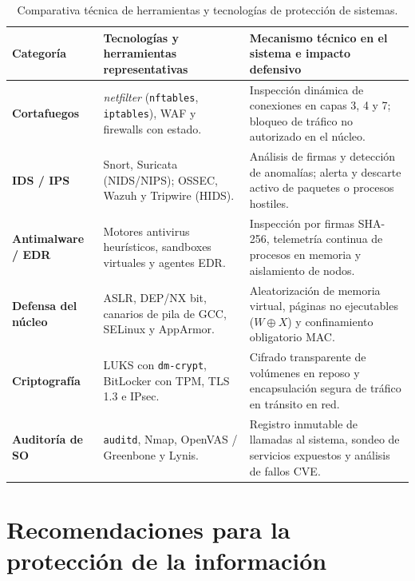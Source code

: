 \documentclass[12pt]{article}
\begin{document}
\begin{table}[htbp]
\centering
\footnotesize
\renewcommand{\arraystretch}{1.1}
\renewcommand{\tabularxcolumn}[1]{m{#1}}
\setlength{\emergencystretch}{1.5em}
\caption{Comparativa técnica de herramientas y tecnologías de protección de sistemas.}
\label{tab:comparativaHerramientasSeguridad}
\begin{tabularx}{\textwidth}{>{\centering\arraybackslash}m{2.4cm} X X}
\toprule
\textbf{Categoría} & \textbf{Tecnologías y herramientas representativas} & \textbf{Mecanismo técnico en el sistema e impacto defensivo} \\
\midrule
\textbf{Cortafuegos} & \textit{netfilter} (\texttt{nftables}, \texttt{iptables}), WAF y firewalls con estado. & Inspección dinámica de conexiones en capas 3, 4 y 7; bloqueo de tráfico no autorizado en el núcleo. \\
\addlinespace
\textbf{IDS / IPS} & Snort, Suricata (NIDS/NIPS); OSSEC, Wazuh y Tripwire (HIDS). & Análisis de firmas y detección de anomalías; alerta y descarte activo de paquetes o procesos hostiles. \\
\addlinespace
\textbf{Antimalware / EDR} & Motores antivirus heurísticos, sandboxes virtuales y agentes EDR. & Inspección por firmas SHA-256, telemetría continua de procesos en memoria y aislamiento de nodos. \\
\addlinespace
\textbf{Defensa del núcleo} & ASLR, DEP/NX bit, canarios de pila de GCC, SELinux y AppArmor. & Aleatorización de memoria virtual, páginas no ejecutables ($W \oplus X$) y confinamiento obligatorio MAC. \\
\addlinespace
\textbf{Criptografía} & LUKS con \texttt{dm-crypt}, BitLocker con TPM, TLS 1.3 e IPsec. & Cifrado transparente de volúmenes en reposo y encapsulación segura de tráfico en tránsito en red. \\
\addlinespace
\textbf{Auditoría de SO} & \texttt{auditd}, Nmap, OpenVAS / Greenbone y Lynis. & Registro inmutable de llamadas al sistema, sondeo de servicios expuestos y análisis de fallos CVE. \\
\bottomrule
\end{tabularx}
\end{table}

\section{Recomendaciones para la protección de la información}\label{sec:recomendacionesProteccionInformacion}
\end{document}
